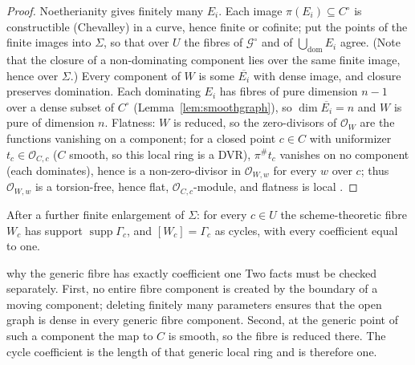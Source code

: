 \documentclass[acmsmall,screen,nonacm]{acmart}
\theoremstyle{definition}
\theoremstyle{remark}
\DeclareMathOperator{\supp}{supp}
\newcommand{\OO}{\mathcal{O}}
\newcommand{\Gfam}{\mathcal{G}}
\begin{document}
\begin{proof}
Noetherianity gives finitely many $E_i$.  Each image
$\pi(E_i)\subseteq C^\circ$ is constructible (Chevalley) in a curve,
hence finite or cofinite; put the points of the finite images into
$\Sigma$, so that over $U$ the fibres of $\Gfam^\circ$ and of
$\bigcup_{\mathrm{dom}}E_i$ agree.  (Note that the closure of a
non-dominating component lies over the same finite image, hence over
$\Sigma$.)  Every component of $W$ is some $\overline{E_i}$ with dense
image, and closure preserves domination.  Each dominating $E_i$ has
fibres of pure dimension $n-1$ over a dense subset of $C^\circ$
(Lemma~\ref{lem:smoothgraph}), so $\dim\overline{E_i}=n$ and $W$ is
pure of dimension $n$.  Flatness: $W$ is reduced, so the zero-divisors
of $\OO_W$ are the functions vanishing on a component; for a closed
point $c\in C$ with uniformizer $t_c\in\OO_{C,c}$ ($C$ smooth, so this
local ring is a DVR), $\pi^\#t_c$ vanishes on no component (each
dominates), hence is a non-zero-divisor in $\OO_{W,w}$ for every $w$
over $c$; thus $\OO_{W,w}$ is a torsion-free, hence flat,
$\OO_{C,c}$-module, and flatness is local
\cite[III.9.7]{Hartshorne77}.
\end{proof}

\begin{lemma}\label{lem:genericfibers}
After a further finite enlargement of $\Sigma$: for every $c\in U$ the
scheme-theoretic fibre $W_c$ has support $\supp\Gamma_c$, and
$[W_c]=\Gamma_c$ as cycles, with every coefficient equal to one.
\end{lemma}

\begin{roadmapbox}{why the generic fibre has exactly coefficient one}
Two facts must be checked separately.  First, no entire fibre component is
created by the boundary of a moving component; deleting finitely many
parameters ensures that the open graph is dense in every generic fibre
component.  Second, at the generic point of such a component the map to $C$
is smooth, so the fibre is reduced there.  The cycle coefficient is the length
of that generic local ring and is therefore one.
\end{roadmapbox}
\end{document}
